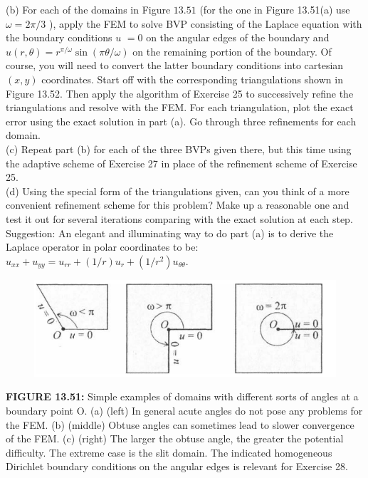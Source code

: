 \documentclass[../main.tex]{subfiles}
\begin{document}
\begin{enumerate}
(b) For each of the domains in Figure $13.51$ (for the one in Figure 13.51(a) use $\omega=2 \pi / 3$ ), apply the FEM to solve BVP consisting of the Laplace equation with the boundary conditions $u$ $=0$ on the angular edges of the boundary and $u(r, \theta)=r^{\pi / \omega} \sin (\pi \theta / \omega)$ on the remaining portion of the boundary. Of course, you will need to convert the latter boundary conditions into cartesian $(x, y)$ coordinates. Start off with the corresponding triangulations shown in Figure 13.52. Then apply the algorithm of Exercise 25 to successively refine the triangulations and resolve with the FEM. For each triangulation, plot the exact error using the exact solution in part (a). Go through three refinements for each domain.\\
(c) Repeat part (b) for each of the three BVPs given there, but this time using the adaptive scheme of Exercise 27 in place of the refinement scheme of Exercise 25.\\
(d) Using the special form of the triangulations given, can you think of a more convenient refinement scheme for this problem? Make up a reasonable one and test it out for several iterations comparing with the exact solution at each step.
Suggestion: An elegant and illuminating way to do part (a) is to derive the Laplace operator in polar coordinates to be: $u_{x x}+u_{y y}=u_{r r}+(1 / r) u_{r}+\left(1 / r^{2}\right) u_{\theta \theta}$.
\begin{figure}[H]
\includegraphics[width=0.9\linewidth]{38}
	\centering
	\label{pfig:ch13_38}
\end{figure}
\textbf{FIGURE 13.51:} Simple examples of domains with different sorts of angles at a boundary point O. (a) 
(left) In general acute angles do not pose any problems for the FEM. (b) (middle) Obtuse angles can 
sometimes lead to slower convergence of the FEM. (c) (right) The larger the obtuse angle, the greater 
the potential difficulty. The extreme case is the slit domain. The indicated homogeneous Dirichlet 
boundary conditions on the angular edges is relevant for Exercise 28. 
\\
\\

\end{enumerate}
\end{document}
